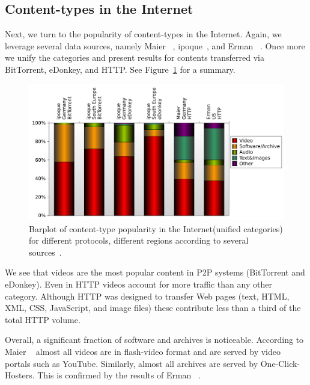 \subsection{Content-types in the Internet}\label{sec:related:ctypes}

Next, we turn to the popularity of content-types in the Internet. Again, we
leverage several data sources, namely Maier
\etal~\cite{OnDominantCharacteristics2009}, ipoque~\cite{ipoque09}, and Erman
\etal~\cite{network-caching}. Once more we unify the categories and present
results for contents transferred via BitTorrent, eDonkey, and HTTP. See
Figure~\ref{fig:related:ctypes} for a summary.

\begin{figure}[tbp]
\centering
\includegraphics[width=0.95\linewidth]{figures-pdf/ctypes}
\renewcommand{\capname}{Barplot of content-type popularity in the
Internet\xspace}
\caption[\capname]{\capname (unified categories) for
different protocols, different regions according to several
sources~\cite{OnDominantCharacteristics2009,ipoque09,network-caching}.}
\label{fig:related:ctypes}
\end{figure}

We see that videos are the most popular content in P2P systems (BitTorrent and
eDonkey). Even in HTTP videos account for more traffic than any other category.
Although HTTP was designed to transfer Web pages (text, \eg HTML, XML, CSS,
JavaScript, and image files) these contribute less than a third of the total
HTTP volume.

Overall, a significant fraction of software and archives is noticeable.
According to Maier \etal~\cite{OnDominantCharacteristics2009} almost all videos
are in flash-video format and are served by video portals such as YouTube.
Similarly, almost all archives are served by One-Click-Hosters. This is
confirmed by the results of Erman \etal~\cite{network-caching}.

